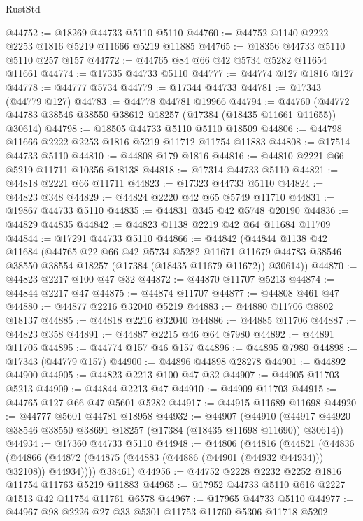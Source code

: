 \begin{lexlean}{RustStd}
\begin{coremodule}
@44752 := @18269 @44733 @5110 @5110
@44760 := @44752 @1140 @2222 @2253 @1816 @5219 @11666 @5219 @11885
@44765 := @18356 @44733 @5110 @5110 @257 @157
@44772 := @44765 @84 @66 @42 @5734 @5282 @11654 @11661
@44774 := @17335 @44733 @5110
@44777 := @44774 @127 @1816 @127
@44778 := @44777 @5734
@44779 := @17344 @44733
@44781 := @17343 (@44779 @127)
@44783 := @44778 @44781 @19966
@44794 := @44760 (@44772 @44783 @38546 @38550 @38612 @18257 (@17384 (@18435 @11661 @11655)) @30614)
@44798 := @18505 @44733 @5110 @5110 @18509
@44806 := @44798 @11666 @2222 @2253 @1816 @5219 @11712 @11754 @11883
@44808 := @17514 @44733 @5110
@44810 := @44808 @179 @1816
@44816 := @44810 @2221 @66 @5219 @11711 @10356 @18138
@44818 := @17314 @44733 @5110
@44821 := @44818 @2221 @66 @11711
@44823 := @17323 @44733 @5110
@44824 := @44823 @348
@44829 := @44824 @2220 @42 @65 @5749 @11710
@44831 := @19867 @44733 @5110
@44835 := @44831 @345 @42 @5748 @20190
@44836 := @44829 @44835
@44842 := @44823 @1138 @2219 @42 @64 @11684 @11709
@44844 := @17291 @44733 @5110
@44866 := @44842
    (@44844
      @1138
      @42
      @11684
      (@44765
        @22
        @66
        @42
        @5734
        @5282
        @11671
        @11679
        @44783
        @38546
        @38550
        @38554
        @18257
        (@17384 (@18435 @11679 @11672))
        @30614))
@44870 := @44823 @2217 @100 @47 @32
@44872 := @44870 @11707 @5213
@44874 := @44844 @2217 @47
@44875 := @44874 @11707
@44877 := @44808 @461 @47
@44880 := @44877 @2216 @32040 @5219
@44883 := @44880 @11706 @8802 @18137
@44885 := @44818 @2216 @32040
@44886 := @44885 @11706
@44887 := @44823 @358
@44891 := @44887 @2215 @46 @64 @7980
@44892 := @44891 @11705
@44895 := @44774 @157 @46 @157
@44896 := @44895 @7980
@44898 := @17343 (@44779 @157)
@44900 := @44896 @44898 @28278
@44901 := @44892 @44900
@44905 := @44823 @2213 @100 @47 @32
@44907 := @44905 @11703 @5213
@44909 := @44844 @2213 @47
@44910 := @44909 @11703
@44915 := @44765 @127 @66 @47 @5601 @5282
@44917 := @44915 @11689 @11698
@44920 := @44777 @5601 @44781 @18958
@44932 := @44907
    (@44910 (@44917 @44920 @38546 @38550 @38691 @18257 (@17384 (@18435 @11698 @11690)) @30614))
@44934 := @17360 @44733 @5110
@44948 := @44806
    (@44816
      (@44821
        (@44836
          (@44866 (@44872 (@44875 (@44883 (@44886 (@44901 (@44932 @44934))) @32108)) @44934))))
      @38461)
@44956 := @44752 @2228 @2232 @2252 @1816 @11754 @11763 @5219 @11883
@44965 := @17952 @44733 @5110 @616 @2227 @1513 @42 @11754 @11761 @6578
@44967 := @17965 @44733 @5110
@44977 := @44967 @98 @2226 @27 @33 @5301 @11753 @11760 @5306 @11718 @5202

\end{coremodule}
\end{lexlean}
